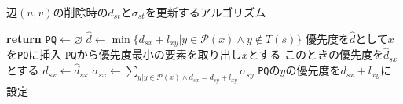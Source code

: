 \begin{algorithm}[tb]
  \caption{辺$(u,v)$の削除時の$d_{st}$と$\sigma_{st}$を更新するアルゴリズム}
  \label{alg:decremental-algorithm}
  \begin{algorithmic}[1]\small
    \State \textbf{return}
    \EndIf
    \State $\texttt{PQ}\gets\varnothing$
    \State $\hat{d}\gets\min\{d_{sx}+l_{xy}|y\in\mathcal{P}(x)\land y\notin T(s)\}$
    \State 優先度を$\hat{d}$として$x$を\texttt{PQ}に挿入
    \EndIf
    \EndFor
    \State $\texttt{PQ}$から優先度最小の要素を取り出し$x$とする
    \State このときの優先度を$\hat{d}_{sx}$とする
    \State $d_{sx}\gets\hat{d}_{sx}$
    \State $\sigma_{sx}\gets\sum_{y|y\in\mathcal{P}(x)\land d_{sx}=d_{sy}+l_{xy}}\sigma_{sy}$
    \State \texttt{PQ}の$y$の優先度を$d_{sx}+l_{xy}$に設定
    \EndIf
    \EndFor
    \EndWhile
    \EndProcedure
  \end{algorithmic}
\end{algorithm}
